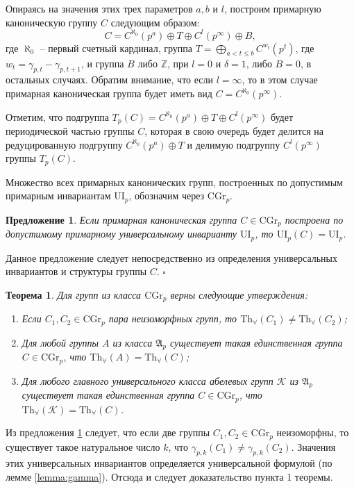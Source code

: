 \documentclass[a4paper,11pt,twoside]{article}
\newtheorem{theorem}{Теорема}[section]
\newtheorem{proposition}{Предложение}[section]
\def\proof{{\noindent{\bf Доказательство.}} }
\def\A{{\mathfrak{A}}}
\def\K{{\mathcal{K}}}
\def\Z{{\mathbb{Z}}}
\def\Tha{{\mathrm{Th}_\forall}}
\def\CG{{\mathrm{CGr}}}
\def\ui{{\mathrm{UI}}}
\begin{document}
Опираясь на значения этих трех параметров $a, b$ и $l$, построим примарную каноническую группу $C$ следующим образом:
$$C = C^{\aleph_0}(p^a) \oplus T \oplus C^l(p^\infty) \oplus B ,$$
где $\aleph_0$ -- первый счетный кардинал, группа $T = \bigoplus\limits_{ a < t \leq b} C^{w_t}(p^t)$, где $w_t = \gamma_{p,t} - \gamma_{p,t+1}$, и группа $B$ либо $\Z$, при $l = 0$ и $\delta = 1$, либо $B = 0$, в остальных случаях. Обратим внимание, что если $l = \infty$, то в этом случае примарная каноническая группа будет иметь вид $C = C^{\aleph_0}(p^\infty)$.

Отметим, что подгруппа $T_p(C) = C^{\aleph_0}(p^a) \oplus T \oplus C^l(p^\infty)$ будет периодической частью группы $C$, которая в свою очередь будет делится на редуцированную подгруппу $C^{\aleph_0}(p^a) \oplus T$ и делимую подгруппу $C^l(p^\infty)$ группы $T_p(C)$.

Множество всех примарных канонических групп, построенных по допустимым примарным инвариантам $\ui_p$, обозначим через $\CG_p$.

\begin{proposition}\label{prop:UnivEnvForCannonicalGroup}
Если примарная каноническая группа $C \in \CG_p$ построена по допустимому примарному универсальному инварианту $\ui_p$, то $\ui_p(C) = \ui_p$.
\end{proposition}
\proof Данное предложение следует непосредственно из определения универсальных инвариантов и структуры группы $C$. $\square$

\begin{theorem}\label{th:CannonicalGroupsP}
Для групп из класса $\CG_p$ верны следующие утверждения:
\begin{enumerate}
\item Если $C_1, C_2 \in \CG_p$ пара неизоморфных групп, то $\Tha(C_1) \neq \Tha(C_2)$;
\item Для любой группы $A$ из класса $\A_p$ существует такая единственная группа $C \in \CG_p$, что $\Tha(A) = \Tha(C)$;
\item Для любого главного универсального класса абелевых групп $\K$ из $\A_p$ существует такая единственная группа $C \in \CG_p$, что $\Tha(\K) = \Tha(C)$.
\end{enumerate}
\end{theorem}
\proof Из предложения \ref{prop:UnivEnvForCannonicalGroup} следует, что если две группы $C_1, C_2 \in \CG_p$ неизоморфны, то существует такое натуральное число $k$, что $\gamma_{p,k}(C_1) \neq \gamma_{p,k}(C_2)$. Значения этих универсальных инвариантов определяется универсальной формулой (по лемме \ref{lemma:gamma}). Отсюда и следует доказательство пункта 1 теоремы.
\end{document}
